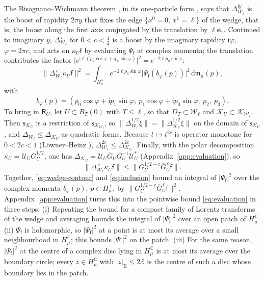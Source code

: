 \documentclass[aps,prl,reprint,longbibliography,raggedbottom]{revtex4-2}
\newcommand{\C}{\mathbb C}
\newcommand{\ii}{\mathrm i}
\newcommand{\dd}{\,\mathrm d}
\newcommand{\norm}[1]{\lVert #1\rVert}
\newcommand{\abs}[1]{\lvert #1\rvert}
\newcommand{\Res}{\mathsf R}
\newcommand{\sx}{\mathsf f}
\newcommand{\eone}{\mathbf e_1}
\newcommand{\Energy}{\mathcal E}
\begin{document}
The Bisognano--Wichmann theorem \cite{BW75}, in its
one-particle form \cite{BGL02}, says that
$\Delta_{\mathcal W_\ell}^{\ii y}$ is the boost of rapidity $2\pi y$
that fixes the edge $\{x^0=0,\,x^1=\ell\}$ of the wedge, that is, the
boost along the first axis conjugated by the translation by
$\ell\eone$. Continued to imaginary $y$,
$\Delta_{\mathcal W_\ell}^{\,c}$ for $0<c<\frac12$ is a boost by the
imaginary rapidity $\ii\varphi$, $\varphi=2\pi c$, and acts on
$\kappa_U\sx$ by evaluating $\Psi_\sx$ at complex momenta; the
translation contributes the factor
$\abs{e^{\ii\ell(p_1\cos\varphi+\ii p_0\sin\varphi)}}^2
=e^{-2\ell p_0\sin\varphi}$:
\begin{equation}
\norm{\Delta_{\mathcal W_\ell}^{\,c}\kappa_U\sx}^2
=\int_{H_\mu^+}e^{-2\ell p_0\sin\varphi}
\abs{\Psi_\sx(b_\varphi(p))}^2\dd\mathfrak m_\mu(p),
\label{eq:wedge-contour}
\end{equation}
with
\[
b_\varphi(p)=(p_0\cos\varphi+\ii p_1\sin\varphi,\ p_1\cos\varphi+\ii p_0\sin\varphi,\ p_2,\ p_3).
\]
To bring in $\Res_U$, let $U\subset B_T(0)$ with $T\le\ell$, so
that $D_T\subset\mathcal W_\ell$ and
$\mathcal K_U\subset\mathcal K_{\mathcal W_\ell}$. Then
$\mathsf s_{\mathcal K_U}$ is a restriction of
$\mathsf s_{\mathcal K_{\mathcal W_\ell}}$, so
$\norm{\Delta_{\mathcal W_\ell}^{1/2}\xi}=\norm{\Delta_{\mathcal K_U}^{1/2}\xi}$
on the domain of $\mathsf s_{\mathcal K_U}$, and
$\Delta_{\mathcal W_\ell}\le\Delta_{\mathcal K_U}$ as quadratic forms.
Because $t\mapsto t^{2c}$ is operator monotone for $0<2c<1$
(L\"owner--Heinz \cite{Heinz51}),
$\Delta_{\mathcal W_\ell}^{2c}\le\Delta_{\mathcal K_U}^{2c}$. Finally,
with the polar decomposition $\kappa_U=\mathcal U_UG_U^{1/2}$, one has
$\Delta_{\mathcal K_U}=\mathcal U_U\overline G_UG_U^{-1}\mathcal U_U^*$
(Appendix~\ref{app:evaluation}), so
\begin{equation}
\norm{\Delta_{\mathcal W_\ell}^{\,c}\kappa_U\sx}
\le\norm{G_U^{1/2-c}\overline G_U^{\,c}\sx}.
\label{eq:inclusion}
\end{equation}
Together, \eqref{eq:wedge-contour} and \eqref{eq:inclusion} bound
an integral of $\abs{\Psi_\sx}^2$ over the complex momenta $b_\varphi(p)$,
$p\in H_\mu^+$, by $\norm{G_U^{1/2-c}\overline G_U^{\,c}\sx}^2$.
Appendix~\ref{app:evaluation} turns this into the pointwise bound
\eqref{eq:evaluation} in three steps. (i) Repeating the bound for a
compact family of Lorentz transforms of the wedge and averaging bounds
the integral of $\abs{\Psi_\sx}^2$ over an open patch of
$H_\mu^{\C}$. (ii) $\Psi_\sx$ is holomorphic, so $\abs{\Psi_\sx}^2$ at
a point is at most its average over a small neighbourhood in
$H_\mu^{\C}$; this bounds $\abs{\Psi_\sx}^2$ on the patch. (iii) For
the same reason, $\abs{\Psi_\sx}^2$ at the centre of a complex disc
lying in $H_\mu^{\C}$ is at most its average over the boundary circle;
every $z\in H_\mu^{\C}$ with $\abs z_{\mathrm E}\le2\Energy$ is the
centre of such a disc whose boundary lies in the patch.
\end{document}
